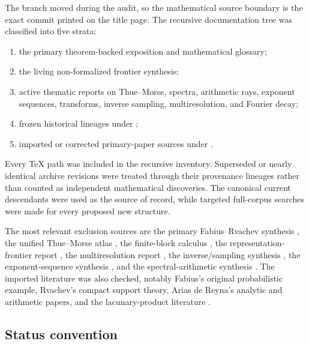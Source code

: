 \documentclass[11pt,oneside]{article}
\theoremstyle{definition}
\begin{document}
The branch moved during the audit, so the mathematical source boundary is the
exact commit printed on the title page.  The recursive documentation tree was
classified into five strata:
\begin{enumerate}
\item the primary theorem-backed exposition and mathematical glossary;
\item the living non-formalized frontier synthesis;
\item active thematic reports on Thue--Morse, spectra, arithmetic rays,
      exponent sequences, transforms, inverse sampling, multiresolution, and
      Fourier decay;
\item frozen historical lineages under ;
\item imported or corrected primary-paper sources under .
\end{enumerate}
Every TeX path was included in the recursive inventory.  Superseded or nearly
identical archive revisions were treated through their provenance lineages
rather than counted as independent mathematical discoveries.  The canonical
current descendants were used as the source of record, while targeted
full-corpus searches were made for every proposed new structure.

The most relevant exclusion sources are the primary Fabius--Rvachev synthesis
\cite{p2:repoPrimary}, the unified Thue--Morse atlas \cite{p2:repoAtlas}, the
finite-block calculus \cite{p2:repoFiniteBlock}, the representation-frontier
report \cite{p2:repoRepresentations}, the multiresolution report
\cite{p2:repoMultiresolution}, the inverse/sampling synthesis \cite{p2:repoInverse},
the exponent-sequence synthesis \cite{p2:repoExponents}, and the
spectral-arithmetic synthesis \cite{p2:repoSpectra}.  The imported literature was
also checked, notably Fabius's original probabilistic example, Rvachev's compact
support theory, Arias de Reyna's analytic and arithmetic papers, and the
lacunary-product literature \cite{p2:fabius1966,p2:rvachev1990,p2:arias1982,p2:arias2018,p2:aistleitner2017}.

\subsection{Status convention}
\end{document}
